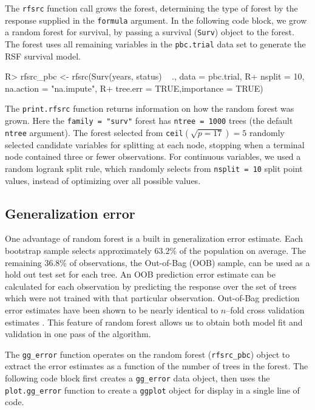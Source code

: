 \documentclass[article]{jss}
\begin{document}
The  \texttt{rfsrc} function call grows the forest,
determining the type of forest by the response supplied in the
\texttt{formula} argument. In the following code block, we grow a random
forest for survival, by passing a survival (\texttt{Surv}) object to the
forest. The forest uses all remaining variables in the
\texttt{pbc.trial} data set to generate the RSF survival model.

\begin{Schunk}
\begin{Sinput}
R> rfsrc_pbc <- rfsrc(Surv(years, status) ~ ., data = pbc.trial,
R+                    nsplit = 10, na.action = "na.impute", 
R+                    tree.err = TRUE,importance = TRUE)
\end{Sinput}
\end{Schunk}

The \texttt{print.rfsrc} function returns information on how the random
forest was grown. Here the \texttt{family\ =\ "surv"} forest has
\texttt{ntree\ =\ 1000} trees (the default \texttt{ntree} argument). The
forest selected from \texttt{ceil}\((\sqrt{p=17}) = 5\) randomly
selected candidate variables for splitting at each node, stopping when a
terminal node contained three or fewer observations. For continuous
variables, we used a random logrank split rule, which randomly selects
from \texttt{nsplit\ =\ 10} split point values, instead of optimizing
over all possible values.

\subsection{Generalization error}\label{generalization-error}

One advantage of random forest is a built in generalization error
estimate. Each bootstrap sample selects approximately \(63.2\%\) of the
population on average. The remaining \(36.8\%\) of observations, the
Out-of-Bag \citep{BreimanOOB:1996e} (OOB) sample, can be used as a hold
out test set for each tree. An OOB prediction error estimate can be
calculated for each observation by predicting the response over the set
of trees which were not trained with that particular observation.
Out-of-Bag prediction error estimates have been shown to be nearly
identical to \(n\)--fold cross validation estimates
\citep{StatisticalLearning:2009}. This feature of random forest allows
us to obtain both model fit and validation in one pass of the algorithm.

The \texttt{gg\_error} function operates on the random forest
(\texttt{rfsrc\_pbc}) object to extract the error estimates as a
function of the number of trees in the forest. The following code block
first creates a \texttt{gg\_error} data object, then uses the
\texttt{plot.gg\_error} function to create a \texttt{ggplot} object for
display in a single line of code.
\end{document}
